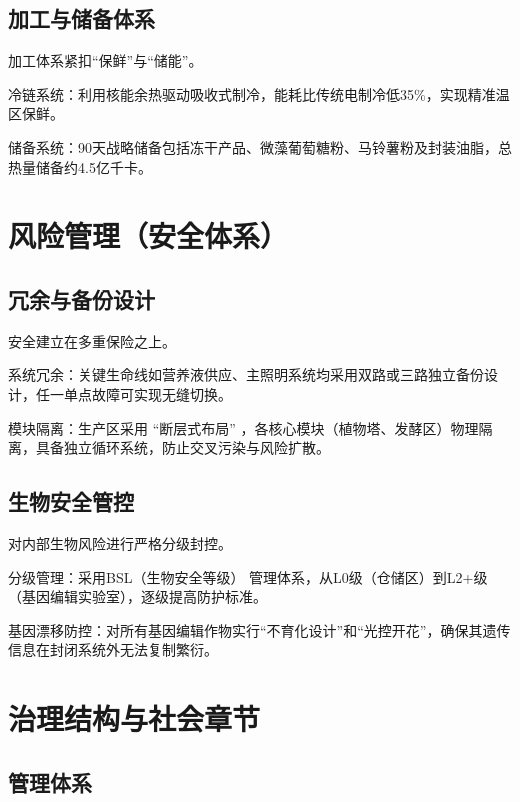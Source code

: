 \subsection{加工与储备体系}\label{ux52a0ux5de5ux4e0eux50a8ux5907ux4f53ux7cfb}

加工体系紧扣``保鲜''与``储能''。

冷链系统：利用核能余热驱动吸收式制冷，能耗比传统电制冷低35\%，实现精准温区保鲜。

储备系统：90天战略储备包括冻干产品、微藻葡萄糖粉、马铃薯粉及封装油脂，总热量储备约4.5亿千卡。

\section{风险管理（安全体系）}\label{ux98ceux9669ux7ba1ux7406ux5b89ux5168ux4f53ux7cfb}

\subsection{冗余与备份设计}\label{ux5197ux4f59ux4e0eux5907ux4efdux8bbeux8ba1}

安全建立在多重保险之上。

系统冗余：关键生命线如营养液供应、主照明系统均采用双路或三路独立备份设计，任一单点故障可实现无缝切换。

模块隔离：生产区采用 ``断层式布局'' ，各核心模块（植物塔、发酵区）物理隔离，具备独立循环系统，防止交叉污染与风险扩散。

\subsection{生物安全管控}\label{ux751fux7269ux5b89ux5168ux7ba1ux63a7}

对内部生物风险进行严格分级封控。

分级管理：采用BSL（生物安全等级） 管理体系，从L0级（仓储区）到L2+级（基因编辑实验室），逐级提高防护标准。

基因漂移防控：对所有基因编辑作物实行``不育化设计''和``光控开花''，确保其遗传信息在封闭系统外无法复制繁衍。

\section{治理结构与社会章节}\label{ux6cbbux7406ux7ed3ux6784ux4e0eux793eux4f1aux7ae0ux8282}

\subsection{管理体系}\label{ux7ba1ux7406ux4f53ux7cfb}

